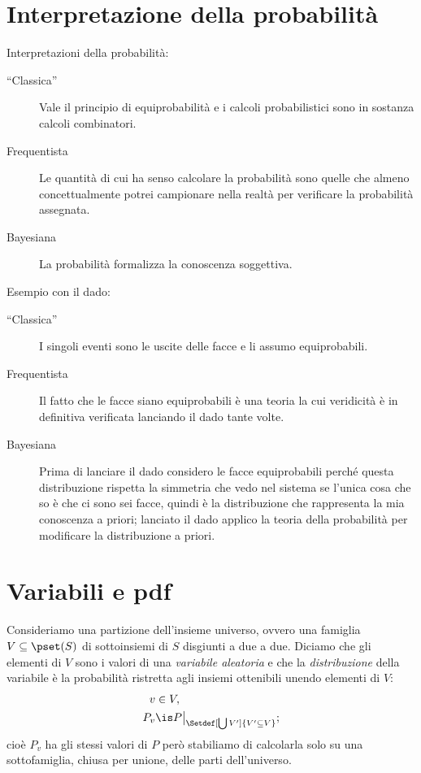 
\section{Interpretazione della probabilità}

Interpretazioni della probabilità:
\begin{description}
	\item[``Classica'']
		Vale il principio di equiprobabilità e i calcoli probabilistici sono in sostanza calcoli combinatori.
	\item[Frequentista]
		Le quantità di cui ha senso calcolare la probabilità sono quelle che almeno concettualmente potrei campionare nella realtà per verificare la probabilità assegnata.
	\item[Bayesiana]
		La probabilità formalizza la conoscenza soggettiva.
\end{description}
Esempio con il dado:
\begin{description}
	\item[``Classica'']
		I singoli eventi sono le uscite delle facce e li assumo equiprobabili.
	\item[Frequentista]
		Il fatto che le facce siano equiprobabili è una teoria la cui veridicità è in definitiva verificata lanciando il dado tante volte.
	\item[Bayesiana]
		Prima di lanciare il dado considero le facce equiprobabili perché questa distribuzione rispetta la simmetria che vedo nel sistema se l'unica cosa che so è che ci sono sei facce, quindi è la distribuzione che rappresenta la mia conoscenza a priori; lanciato il dado applico la teoria della probabilità per modificare la distribuzione a priori.
\end{description}

\section{Variabili e pdf}

\begin{definition}
	Consideriamo una partizione dell'insieme universo,
	ovvero una famiglia $V\subseteq\pset(S)$ di sottoinsiemi di $S$ disgiunti a due a due.
	Diciamo che gli elementi di $V$ sono i valori di una \emph{variabile aleatoria}
	e che la \emph{distribuzione} della variabile è la probabilità
	ristretta agli insiemi ottenibili unendo elementi di $V$:
	\begin{align*}
		v &\in V, \\
		P_v &\is P\big|_{\Setdef[\bigcup V']{V'\subseteq V}};
	\end{align*}
	cioè $P_v$ ha gli stessi valori di $P$
	però stabiliamo di calcolarla solo su una sottofamiglia, chiusa per unione, delle parti dell'universo.
\end{definition}

